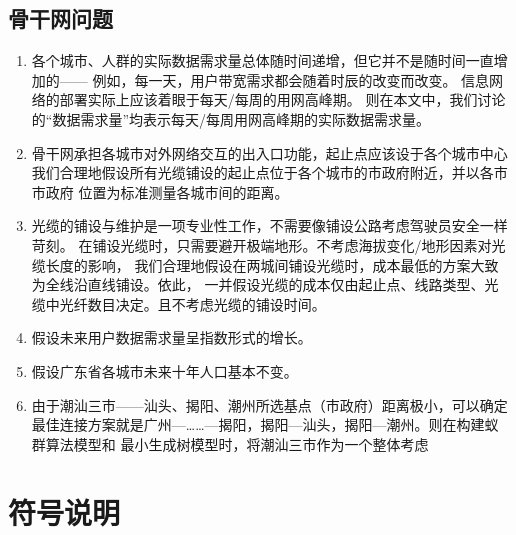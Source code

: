 \documentclass[UTF8,12pt]{ctexart}
\begin{document}
\subsection{骨干网问题}
\begin{enumerate}
    \item 各个城市、人群的实际数据需求量总体随时间递增，但它并不是随时间一直增加的——
          例如，每一天，用户带宽需求都会随着时辰的改变而改变。
          信息网络的部署实际上应该着眼于每天/每周的用网高峰期。
          则在本文中，我们讨论的“数据需求量”均表示每天/每周用网高峰期的实际数据需求量。

    \item 骨干网承担各城市对外网络交互的出入口功能，起止点应该设于各个城市中心
          我们合理地假设所有光缆铺设的起止点位于各个城市的市政府附近，并以各市市政府
          位置为标准测量各城市间的距离。

    \item 光缆的铺设与维护是一项专业性工作，不需要像铺设公路考虑驾驶员安全一样苛刻。
          在铺设光缆时，只需要避开极端地形。不考虑海拔变化/地形因素对光缆长度的影响，
          我们合理地假设在两城间铺设光缆时，成本最低的方案大致为全线沿直线铺设。依此，
          一并假设光缆的成本仅由起止点、线路类型、光缆中光纤数目决定。且不考虑光缆的铺设时间。
    \item 假设未来用户数据需求量呈指数形式的增长。
    \item 假设广东省各城市未来十年人口基本不变。
    \item 由于潮汕三市——汕头、揭阳、潮州所选基点（市政府）距离极小，可以确定
          最佳连接方案就是广州—……—揭阳，揭阳—汕头，揭阳—潮州。则在构建蚁群算法模型和
          最小生成树模型时，将潮汕三市作为一个整体考虑
\end{enumerate}


\section{符号说明}
\end{document}
